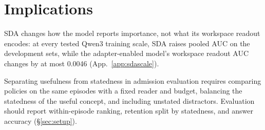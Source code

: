 \section{Implications}
\label{sec:implications}

SDA changes how the model reports importance, not what its workspace
readout encodes: at every tested Qwen3 training scale, SDA raises pooled
AUC on the development sets, while the adapter-enabled model's
workspace readout AUC changes by at most 0.0046
(App.~\ref{app:sdascale}).

Separating usefulness from statedness in admission evaluation
requires comparing policies on the same episodes with a fixed
reader and budget, balancing the statedness of the useful concept,
and including unstated distractors. Evaluation should report
within-episode ranking, retention split by statedness, and answer
accuracy (\S\ref{sec:setup}).
